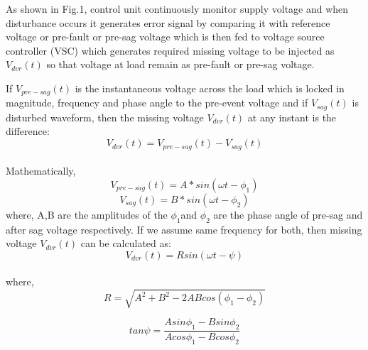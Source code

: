 \documentclass[journal,twoside]{IEEEtran}
\begin{document}
\bigskip
As shown in Fig.1, control unit continuously monitor supply voltage and when disturbance occurs it generates error signal by comparing it with reference voltage or pre-fault or pre-sag voltage which is then fed to voltage source controller (VSC) which generates required missing voltage to be injected as $V_{dvr}(t)$ so that voltage at load remain as pre-fault or pre-sag voltage.

\bigskip
If $V_{pre-sag}(t)$ is the instantaneous voltage across the load which is locked in magnitude, frequency and phase angle to the pre-event voltage and if $V_{sag}(t)$ is disturbed waveform, then the missing voltage $V_{dvr} (t)$ at any instant is the difference:\\
\begin{equation}
V_{dvr}(t) =V_{pre-sag}(t)-V_{sag}(t)
\end{equation}
\\Mathematically,\\
\begin{equation}
V_{pre-sag}(t)=A*sin(\omega t-\phi _{1})
\end{equation}
\begin{equation}
V_{sag}(t)=B*sin(\omega t-\phi _{2})
\end{equation}
where, A,B are the amplitudes of the $\phi _1$and $\phi _2$  are the phase angle of pre-sag and after sag voltage respectively. If we assume same frequency for both, then missing voltage $V_{dvr}(t)$ can be calculated as:\\
\begin{equation}
V_{dvr}(t)=Rsin(\omega t - \psi)
\end{equation}
\\where,\\
\begin{equation}
R=\sqrt{A^2+B^2-2ABcos(\phi _1-\phi _2)}
\end{equation}


\bigskip
\begin{equation}
tan{ \psi }=\frac{Asin{\phi _1}-Bsin{\phi _2}}{Acos{\phi _1}-Bcos{\phi _2}}
\end{equation}

\bigskip
\end{document}
